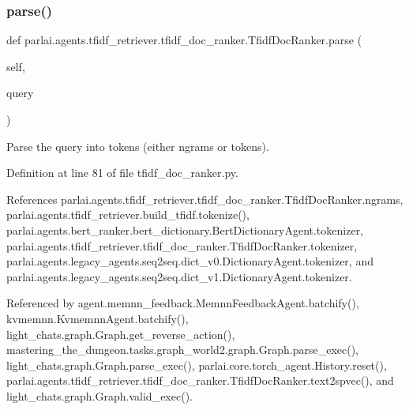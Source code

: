 \subsubsection{\texorpdfstring{parse()}{parse()}}
{\footnotesize\ttfamily def parlai.\+agents.\+tfidf\+\_\+retriever.\+tfidf\+\_\+doc\+\_\+ranker.\+Tfidf\+Doc\+Ranker.\+parse (\begin{DoxyParamCaption}\item[{}]{self,  }\item[{}]{query }\end{DoxyParamCaption})}

\begin{DoxyVerb}Parse the query into tokens (either ngrams or tokens).\end{DoxyVerb}
 

Definition at line 81 of file tfidf\+\_\+doc\+\_\+ranker.\+py.



References parlai.\+agents.\+tfidf\+\_\+retriever.\+tfidf\+\_\+doc\+\_\+ranker.\+Tfidf\+Doc\+Ranker.\+ngrams, parlai.\+agents.\+tfidf\+\_\+retriever.\+build\+\_\+tfidf.\+tokenize(), parlai.\+agents.\+bert\+\_\+ranker.\+bert\+\_\+dictionary.\+Bert\+Dictionary\+Agent.\+tokenizer, parlai.\+agents.\+tfidf\+\_\+retriever.\+tfidf\+\_\+doc\+\_\+ranker.\+Tfidf\+Doc\+Ranker.\+tokenizer, parlai.\+agents.\+legacy\+\_\+agents.\+seq2seq.\+dict\+\_\+v0.\+Dictionary\+Agent.\+tokenizer, and parlai.\+agents.\+legacy\+\_\+agents.\+seq2seq.\+dict\+\_\+v1.\+Dictionary\+Agent.\+tokenizer.



Referenced by agent.\+memnn\+\_\+feedback.\+Memnn\+Feedback\+Agent.\+batchify(), kvmemnn.\+Kvmemnn\+Agent.\+batchify(), light\+\_\+chats.\+graph.\+Graph.\+get\+\_\+reverse\+\_\+action(), mastering\+\_\+the\+\_\+dungeon.\+tasks.\+graph\+\_\+world2.\+graph.\+Graph.\+parse\+\_\+exec(), light\+\_\+chats.\+graph.\+Graph.\+parse\+\_\+exec(), parlai.\+core.\+torch\+\_\+agent.\+History.\+reset(), parlai.\+agents.\+tfidf\+\_\+retriever.\+tfidf\+\_\+doc\+\_\+ranker.\+Tfidf\+Doc\+Ranker.\+text2spvec(), and light\+\_\+chats.\+graph.\+Graph.\+valid\+\_\+exec().

